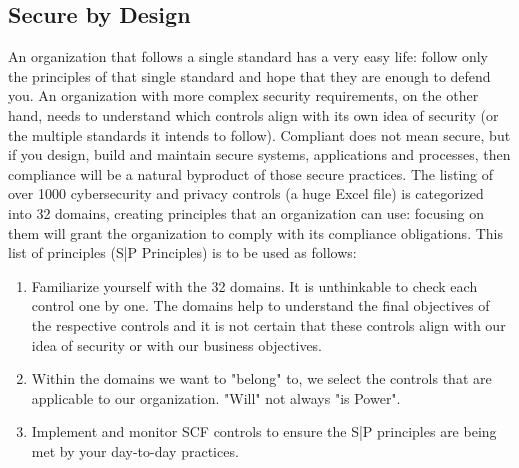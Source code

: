 \subsection{Secure by Design}
An organization that follows a single standard has a very easy life: follow only the principles of that single standard and hope that they are enough to defend you. An organization with more complex security requirements, on the other hand, needs to understand which controls align with its own idea of security (or the multiple standards it intends to follow). Compliant does not mean secure, but if you design, build and maintain secure systems, applications and processes, then compliance will be a natural byproduct of those secure practices. The listing of over 1000 cybersecurity and privacy controls (a huge Excel file) is categorized into 32 domains, creating principles that an organization can use: focusing on them will grant the organization to comply with its compliance obligations. This list of principles (S|P Principles) is to be used as follows:
\begin{enumerate}
    \item Familiarize yourself with the 32 domains. It is unthinkable to check each control one by one. The domains help to understand the final objectives of the respective controls and it is not certain that these controls align with our idea of security or with our business objectives.
    \item Within the domains we want to "belong" to, we select the controls that are applicable to our organization. "Will" not always "is Power".
    \item Implement and monitor SCF controls to ensure the S|P principles are being met by your day-to-day practices.
\end{enumerate}
